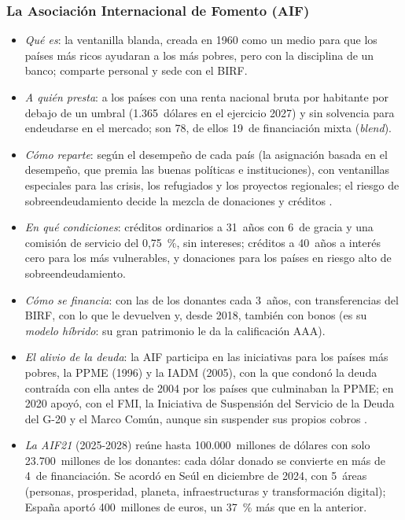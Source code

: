 \documentclass[11pt]{article}
\begin{document}
\subsubsection{La Asociación Internacional de Fomento (AIF)}\label{sec:aif}

\begin{itemize}
\item \emph{Qué es}: la ventanilla blanda, creada en 1960 como un medio para que los países más ricos ayudaran a los más pobres, pero con la disciplina de un banco; comparte personal y sede con el BIRF.
\item \emph{A quién presta}: a los países con una renta nacional bruta por habitante por debajo de un umbral (1.365~dólares en el ejercicio 2027) y sin solvencia para endeudarse en el mercado; son 78, de ellos 19~de financiación mixta (\emph{blend})\nocite{AIF2026Paises}.
\item \emph{Cómo reparte}: según el desempeño de cada país (la asignación basada en el desempeño, que premia las buenas políticas e instituciones), con ventanillas especiales para las crisis, los refugiados y los proyectos regionales; el riesgo de sobreendeudamiento decide la mezcla de donaciones y créditos .
\item \emph{En qué condiciones}: créditos ordinarios a 31~años con 6~de gracia y una comisión de servicio del 0,75~\%, sin intereses; créditos a 40~años a interés cero para los más vulnerables, y donaciones para los países en riesgo alto de sobreendeudamiento\nocite{AIF2026Condiciones}.
\item \emph{Cómo se financia}: con las  de los donantes cada 3~años, con transferencias del BIRF, con lo que le devuelven y, desde 2018, también con bonos (es su \emph{modelo híbrido}: su gran patrimonio le da la calificación AAA).
\item \emph{El alivio de la deuda}: la AIF participa en las iniciativas para los países más pobres, la PPME (1996) y la IADM (2005), con la que condonó la deuda contraída con ella antes de 2004 por los países que culminaban la PPME; en 2020 apoyó, con el FMI, la Iniciativa de Suspensión del Servicio de la Deuda del G-20 y el Marco Común, aunque sin suspender sus propios cobros \nocite{BM2022DSSI}.
\item \emph{La AIF21} (2025-2028) reúne hasta 100.000~millones de dólares con solo 23.700~millones de los donantes: cada dólar donado se convierte en más de 4~de financiación. Se acordó en Seúl en diciembre de 2024, con 5~áreas (personas, prosperidad, planeta, infraestructuras y transformación digital); España aportó 400~millones de euros, un 37~\% más que en la anterior\nocite{AIF2025AIF21,BM2024AIF21Espana}.
\end{itemize}
\end{document}
